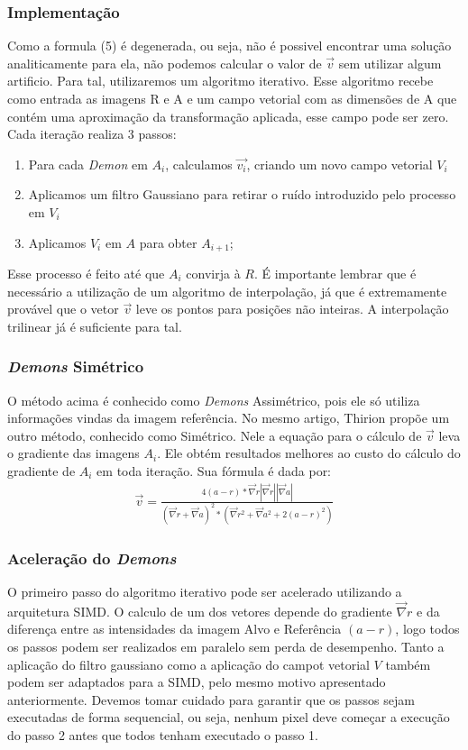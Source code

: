 \subsubsection{Implementação}
    Como a formula (5) é degenerada, ou seja, não é possivel encontrar uma solução analiticamente para ela,
não podemos calcular o valor de $\vec{v}$ sem utilizar algum artificio. Para tal,
utilizaremos um algoritmo iterativo. Esse algoritmo recebe como entrada as imagens R e A e um campo vetorial
com as dimensões de A que contém uma aproximação da transformação aplicada, esse campo pode ser zero. 
Cada iteração realiza 3 passos:
\begin{enumerate}
    \item Para cada \textit{Demon} em $A_i$, calculamos $\vec{v_i}$, criando um novo campo vetorial $V_i$
    \item Aplicamos um filtro Gaussiano para retirar o ruído introduzido pelo processo em $V_i$
    \item Aplicamos $V_i$ em $A$ para obter $A_{i+1}$;
\end{enumerate}
    Esse processo é feito até que $A_i$ convirja à $R$. É importante lembrar que é necessário a
utilização de um algoritmo de interpolação, já que é extremamente provável que o vetor $\vec{v}$
leve os pontos para posições não inteiras. A interpolação trilinear já é suficiente para tal.

\subsubsection{\textit{Demons} Simétrico}
    O método acima é conhecido como \textit{Demons} Assimétrico, pois ele só utiliza informações vindas
da imagem referência. No mesmo artigo, Thirion propõe um outro método, conhecido como Simétrico.
Nele a equação para o cálculo de $\vec{v}$ leva o gradiente das imagens $A_i$. Ele obtém resultados
melhores ao custo do cálculo do gradiente de $A_i$ em toda iteração. Sua fórmula é dada por:
\begin{align}\label{math:demons}
    \vec{v} = \frac{4(a - r)*\vec{\nabla}r|\vec{\nabla}r||\vec{\nabla}a|}
                    {(\vec{\nabla}r+\vec{\nabla}a)^2*(\vec{\nabla}r^2 + \vec{\nabla}a^2 + 2(a - r)^2)}
\end{align}

\subsubsection{Aceleração do \textit{Demons}}
    O primeiro passo do algoritmo iterativo pode ser acelerado utilizando a arquitetura SIMD. O calculo de um dos vetores
depende do gradiente $\vec{\nabla}r$ e da diferença entre as intensidades da imagem Alvo e Referência $(a - r)$, logo
todos os passos podem ser realizados em paralelo sem perda de desempenho. Tanto a aplicação do filtro gaussiano como
a aplicação do campot vetorial $V$ também podem ser adaptados para a SIMD, pelo mesmo motivo apresentado anteriormente.
Devemos tomar cuidado para garantir que os passos sejam executadas de forma sequencial, ou seja, nenhum pixel deve começar
a execução do passo 2 antes que todos tenham executado o passo 1.

